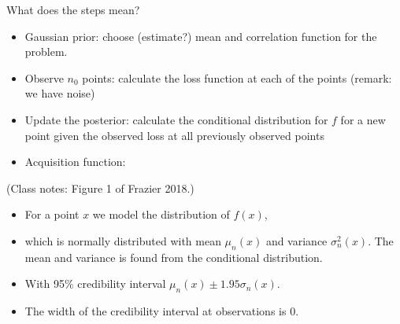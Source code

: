 \documentclass[
  ignorenonframetext,
]{beamer}
\providecommand{\tightlist}{%
  \setlength{\itemsep}{0pt}\setlength{\parskip}{0pt}}
\begin{document}
\begin{frame}

What does the steps mean?

\begin{itemize}
\tightlist
\item
  Gaussian prior: choose (estimate?) mean and correlation function for
  the problem.
\item
  Observe \(n_0\) points: calculate the loss function at each of the
  points (remark: we have noise)
\item
  Update the posterior: calculate the conditional distribution for \(f\)
  for a new point given the observed loss at all previously observed
  points
\item
  Acquisition function:
\end{itemize}

(Class notes: Figure 1 of Frazier 2018.)

\end{frame}

\begin{frame}

\begin{itemize}
\tightlist
\item
  For a point \(x\) we model the distribution of \(f(x)\),
\item
  which is normally distributed with mean \(\mu_n(x)\) and variance
  \(\sigma_n^2(x)\). The mean and variance is found from the conditional
  distribution.
\item
  With 95\% credibility interval \(\mu_n(x)\pm 1.95 \sigma_n(x)\).
\item
  The width of the credibility interval at observations is 0.
\end{itemize}

\end{frame}
\end{document}
